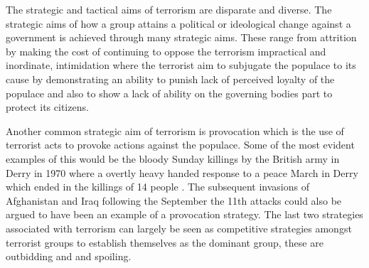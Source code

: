 The strategic and tactical aims of terrorism are disparate and diverse. The strategic aims of how a group attains a political or ideological change against a government is achieved through many strategic aims. These range from attrition by making the cost of continuing to oppose the terrorism impractical and inordinate, intimidation where the terrorist aim to subjugate the populace to its cause by demonstrating an ability to punish lack of perceived loyalty of the populace and also to show a lack of ability on the governing bodies part to protect its citizens. 

Another common strategic aim of terrorism is provocation which is the use of terrorist acts to provoke actions against the populace. Some of the most evident examples of this would be the bloody Sunday killings by the British army in Derry in 1970 where a overtly heavy handed response to a peace March in Derry which ended in the killings of 14 people \citep{dawson2005trauma}. The subsequent invasions of Afghanistan and Iraq following the September the 11th attacks could also be argued to have been an example of a provocation strategy.  The last two strategies associated with terrorism  can largely be seen as competitive strategies amongst terrorist groups to establish themselves as the dominant group, these are outbidding and and spoiling. 

